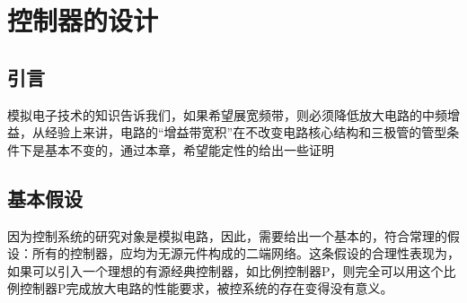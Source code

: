 \documentclass[UTF8,a4paper]{ctexart}
\begin{document}
\section{控制器的设计}
\subsection{引言}
模拟电子技术的知识告诉我们，如果希望展宽频带，则必须降低放大电路的中频增益，从经验上来讲，电路的“增益带宽积”在不改变电路核心结构和三极管的管型条件下是基本不变的，通过本章，希望能定性的给出一些证明
\subsection{基本假设}
因为控制系统的研究对象是模拟电路，因此，需要给出一个基本的，符合常理的假设：所有的控制器，应均为无源元件构成的二端网络。这条假设的合理性表现为，如果可以引入一个理想的有源经典控制器，如比例控制器P，则完全可以用这个比例控制器P完成放大电路的性能要求，被控系统的存在变得没有意义。
\end{document}
